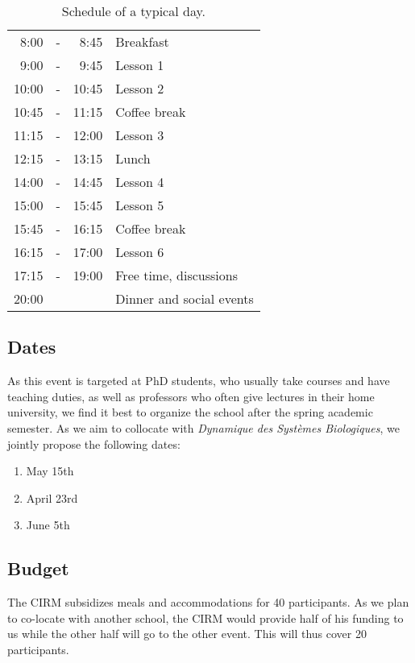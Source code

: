 \documentclass[a4paper]{scrartcl}
\begin{document}
\begin{table}[ht]
	\centering
	\begin{tabular}{rcrl}
	 8:00 & - &  8:45 & Breakfast \\
	 9:00 & - &  9:45 & Lesson 1 \\
	10:00 & - & 10:45 & Lesson 2 \\
	10:45 & - & 11:15 & Coffee break \\
	11:15 & - & 12:00 & Lesson 3 \\
	12:15 & - & 13:15 & Lunch \\
	14:00 & - & 14:45 & Lesson 4 \\
	15:00 & - & 15:45 & Lesson 5 \\
	15:45 & - & 16:15 & Coffee break \\
	16:15 & - & 17:00 & Lesson 6 \\
	17:15 & - & 19:00 & Free time, discussions \\
	20:00 &   &       &  Dinner and social events
	\end{tabular}
	\caption{Schedule of a typical day.}
	\label{schedule}
\end{table}

\subsection{Dates}

As this event is targeted at PhD students, who usually take courses and have
teaching duties, as well as professors who often give lectures in their home
university, we find it best to organize the school after the spring
academic semester. As we aim to collocate with \textit{Dynamique des Systèmes
Biologiques}, we jointly propose the following dates:
\begin{enumerate}
	\setlength{\itemsep}{0pt} \setlength{\parskip}{0pt}
	\item May 15th
	\item April 23rd
	\item June 5th
\end{enumerate}

\subsection{Budget}

The CIRM subsidizes meals and accommodations for 40 participants. As we plan to
co-locate with another school, the CIRM would provide half of his funding to us
while the other half will go to the other event. This will thus cover 20
participants.
\end{document}
